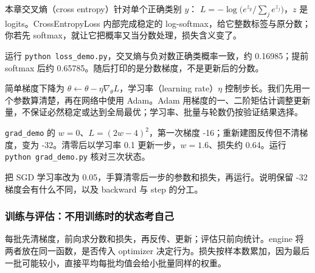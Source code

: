 本章交叉熵（cross entropy）针对单个正确类别 $y$：
$L=-\log\bigl(e^{z_y}/\sum_j e^{z_j}\bigr)$，$z$ 是 logits。CrossEntropyLoss 内部完成稳定的 log-softmax，给它整数标签与原分数；你若先 softmax，就让它把概率又当分数处理，损失含义变了。
\begin{example}[分数、概率和损失别重复加工]
运行 \texttt{python loss\_demo.py}，交叉熵与负对数正确类概率一致，约 0.16985；提前 softmax 后约 0.65785。随后打印的是分数梯度，不是更新后的分数。
\end{example}
\begin{dlblock}

\end{dlblock}
简单梯度下降为 $\theta\leftarrow\theta-\eta\nabla_\theta L$，学习率（learning rate）$\eta$ 控制步长。我们先用一个参数算清楚，再在网络中使用 Adam。Adam 用梯度的一、二阶矩估计调整更新量，不保证必然稳定或达到全局最优；学习率、批量与轮数仍按验证结果选择。
\begin{example}
\texttt{grad\_demo} 的 $w=0$、$L=(2w-4)^2$，第一次梯度 -16；重新建图反传但不清梯度，变为 -32。清零后以学习率 0.1 更新一步，$w=1.6$、损失约 0.64。运行 \texttt{python grad\_demo.py} 核对三次状态。
\end{example}
\begin{dlblock}

\end{dlblock}
\begin{exercise}\label{ex:v2-dl-grad}
把 SGD 学习率改为 0.05，手算清零后一步的参数和损失，再运行。说明保留 -32 梯度会有什么不同，以及 backward 与 step 的分工。
\end{exercise}

\subsubsection{训练与评估：不用训练时的状态考自己}
每批先清梯度，前向求分数和损失，再反传、更新；评估只前向统计。engine 将两者放在同一函数，是否传入 optimizer 决定行为。损失按样本数累加，因为最后一批可能较小，直接平均每批均值会给小批量同样的权重。

